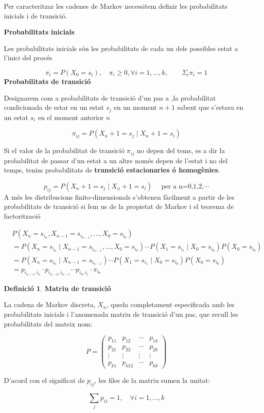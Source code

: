 \documentclass[
  catalan,
]{article}
\theoremstyle{definition}
\newtheorem{definition}{Definició}[section]
\theoremstyle{definition}
\theoremstyle{definition}
\theoremstyle{definition}
\theoremstyle{remark}
\begin{document}
Per caracteritzar les cadenes de Markov necessitem definir les probabilitats inicials i de transició.

\textbf{Probabilitats inicials}

Les probabilitats inicials són les probabilitats de cada un dels possibles estat a l'inici del procés

\[ 
\pi_i=P(X_0=s_i), \quad  \pi_i \geq 0, \forall i=1,...,k, \qquad \Sigma_i \pi_i=1  \label{eq:pi}
\]
\textbf{Probabilitats de transició}

Designarem com a probabilitats de transició d'un pas a ,la probabilitat condicionada de estar en un estat \(s_j\) en un moment \(n+1\) sabent que s'estava en un estat \(s_i\) en el moment anterior \(n\)

\[
 \pi_{ij}=P(X_n+1=s_j \mid X_n+1=s_i )  \label{eq:pij} 
 \]

Si el valor de la probabilitat de transició \(\pi_{ij}\) no depen del tems, es a dir la probabilitat de passar d'un estat a un altre només depen de l'estat i no del temps, tenim probabilitats de \textbf{transició estacionaries ó homogènies}.

\[
 p_{ij}=P(X_n+1=s_j \mid X_n+1=s_i )   \quad  \text{ per a n=0,1,2,} \cdots  
\]
A més les distribucions finito-dimensionals s'obtenen fàcilment a partir de les probabilitats de transició si fem us de la propietat de Markov i el teorema de factorització

\[
\begin{aligned}
& P(X_n = s_{i_n}, X_{n-1} = s_{i_{n-1}}, \dots, X_0 = s_{i_0}) \\ 
&= P(X_n = s_{i_n} \mid X_{n-1} = s_{i_{n-1}}, \dots, X_0 = s_{i_0}) \cdots P(X_1 = s_{i_1} \mid X_0 = s_{i_0}) P(X_0 = s_{i_0}) \\
&= P(X_n = s_{i_n} \mid X_{n-1} = s_{i_{n-1}}) \cdots P(X_1 = s_{i_1} \mid X_0 = s_{i_0}) P(X_0 = s_{i_0}) \\
&= p_{i_{n-1}, i_n} \cdot p_{i_{n-2}, i_{n-1}} \cdots p_{i_0, i_1} \cdot \pi_{i_0}
\end{aligned}
\]

\begin{definition}
\textbf{Matriu de transició}

La cadena de Markov discreta, \(X_n\), queda completament especificada amb les probabilitats inicials i l'anomenada matriu de transició d'un pas, que recull les probabilitats del mateix nom:

\[
P =
\begin{pmatrix}
p_{11} & p_{12}  & \cdots  & p_{1k} \\
p_{21} & p_{22} & \cdots  & p_{2k} \\
\vdots & \vdots & \vdots & \vdots \\
p_{k1} & p_{k12} & \cdots &  p_{kk} 
\end{pmatrix} 
 \label{eq:ptransp}
\]

D'acord con el significat de \(p_{ij}\), les files de la matriu sumen la unitat:

\[
\sum_{j} p_{ij} = 1, \quad \forall i=1,...,k
\]
\end{definition}
\end{document}

